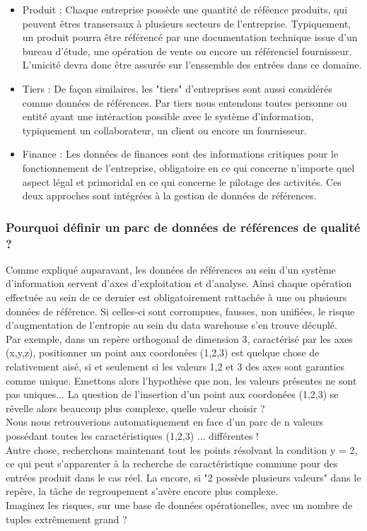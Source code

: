 \begin{itemize}
\item Produit : Chaque entreprise possède une quantité de réféence produits, qui peuvent êtres transersaux à plusieurs secteurs de l'entreprise. Typiquement, un produit pourra être référencé par une documentation technique issue d'un bureau d'étude, une opération de vente  ou encore un référenciel fournisseur. L'unicité devra donc être assurée sur l'enssemble des entrées dans ce domaine.
\item Tiers : De façon similaires, les "tiers" d'entreprises sont aussi considérés comme données de références. Par tiers nous entendons toutes personne ou entité ayant une intéraction possible avec le système d'information, typiquement un collaborateur, un client ou encore un fournisseur.
\item Finance  : Les données de finances sont des informations critiques pour le fonctionnement de l'entreprise, obligatoire en ce qui concerne n'importe quel aspect légal et primoridal en ce qui concerne le pilotage des activités. Ces deux approches sont intégrées à la gestion de données de références.
\end{itemize}

\subsubsection{Pourquoi définir un parc de données de références de qualité ?}

Comme expliqué auparavant, les données de références au sein d'un système d'information servent d'axes d'exploitation et d'analyse. Ainsi chaque opération effectuée au sein de ce dernier est obligatoirement rattachée à une ou plusieurs données de référence. Si celles-ci sont corrompues, fausses, non unifiées, le risque d'augmentation de l'entropie au sein du data warehouse s'en trouve décuplé.\\
Par exemple, dans un repère orthogonal de dimension 3, caractérisé par les axes (x,y,z), positionner un point aux coordonées (1,2,3) est quelque chose de relativement aisé, si et seulement si les valeurs 1,2 et 3 des axes sont garanties comme unique.
Emettons alors l'hypothèse que non, les valeurs présentes ne sont pas uniques... La question de l'insertion d'un point aux coordonées (1,2,3) se révelle alors beaucoup plus complexe, quelle valeur choisir ? \\ 
Nous nous retrouverions automatiquement en face d'un parc de n valeurs possédant toutes les caractéristiques (1,2,3) ... différentes !\\
Autre chose, recherchons maintenant tout les points résolvant la condition y = 2, ce qui peut s'apparenter à la recherche de caractéristique commune pour des entrées produit dans le cas réel.
La encore, si "2 possède plusieurs valeurs" dans le repère, la tâche de regroupement s'avère encore plus complexe.\\
Imaginez les risques, sur une base de données opérationelles, avec un nombre de tuples extrêmement grand ?\\

